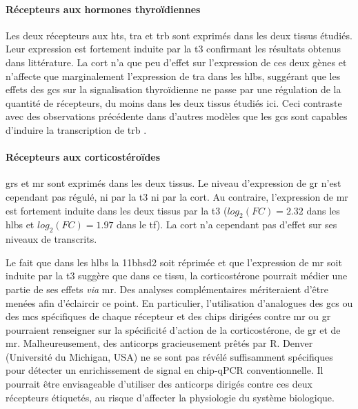 \documentclass[../main.tex]{subfiles}
\begin{document}
			\paragraph{Récepteurs aux hormones thyroïdiennes}
				Les deux récepteurs aux \glspl{ht}, \gls{tra} et \gls{trb} sont exprimés dans les deux tissus étudiés.
				Leur expression est fortement induite par la \gls{t3} confirmant les résultats obtenus dans littérature.
				La \gls{cort} n'a que peu d'effet sur l'expression de ces deux gènes et n'affecte que marginalement l'expression de \gls{tra} dans les \glspl{hlb}, suggérant que les effets des \glspl{gc} sur la signalisation thyroïdienne ne passe par une régulation de la quantité de récepteurs, du moins dans les deux tissus étudiés ici.
				Ceci contraste avec des observations précédente dans d'autres modèles que les \glspl{gc} sont capables d'induire la transcription de \gls{trb} \citep{Montesinos2006}.

			\paragraph{Récepteurs aux corticostéroïdes}
				\glspl{gr} et \gls{mr} sont exprimés dans les deux tissus.
				Le niveau d'expression de \gls{gr} n'est cependant pas régulé, ni par la \gls{t3} ni par la \gls{cort}.
				Au contraire, l'expression de \gls{mr} est fortement induite dans les deux tissus par la \gls{t3} ($log_2(FC)=2.32$ dans les \glspl{hlb} et $log_2(FC)=1.97$ dans le \gls{tf}).
				La \gls{cort} n'a cependant pas d'effet sur ses niveaux de transcrits.
				\par
				Le fait que dans les \glspl{hlb} la \gls{11bhsd2} soit réprimée et que l'expression de \gls{mr} soit induite par la \gls{t3} suggère que dans ce tissu, la corticostérone pourrait médier une partie de ses effets \textit{via} \gls{mr}.
				Des analyses complémentaires mériteraient d'être menées afin d'éclaircir ce point.
				En particulier, l'utilisation d'analogues des \glspl{gc} ou des \glspl{mc} spécifiques de chaque récepteur et des \glspl{chip} dirigées contre \gls{mr} ou \gls{gr} pourraient renseigner sur la spécificité d'action de la corticostérone, de \gls{gr} et de \gls{mr}.
				Malheureusement, des anticorps gracieusement prêtés par R. Denver (Université du Michigan, USA) ne se sont pas révélé suffisamment spécifiques pour détecter un enrichissement de signal en \gls{chip}-qPCR conventionnelle.
				Il pourrait être envisageable d'utiliser des anticorps dirigés contre ces deux récepteurs étiquetés, au risque d'affecter la physiologie du système biologique.
\end{document}
